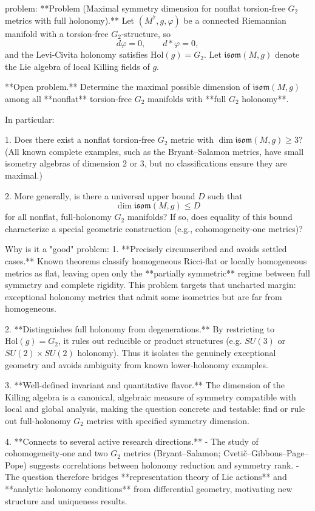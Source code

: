 problem:  
**Problem (Maximal symmetry dimension for nonflat torsion‑free \(G_2\) metrics with full holonomy).**  
Let \((M^7,g,\varphi)\) be a connected Riemannian manifold with a torsion‑free \(G_2\)-structure, so  
\[
d\varphi = 0, \qquad d{*}\varphi = 0,
\]
and the Levi‑Civita holonomy satisfies \(\mathrm{Hol}(g) = G_2\).  
Let \(\mathfrak{isom}(M,g)\) denote the Lie algebra of local Killing fields of \(g\).

**Open problem.**  
Determine the maximal possible dimension of \(\mathfrak{isom}(M,g)\) among all **nonflat** torsion‑free \(G_2\) manifolds with **full \(G_2\) holonomy**.

In particular:

1. Does there exist a nonflat torsion‑free \(G_2\) metric with \(\dim \mathfrak{isom}(M,g)\ge 3\)?  
   (All known complete examples, such as the Bryant–Salamon metrics, have small isometry algebras of dimension \(2\) or \(3\), but no classifications ensure they are maximal.)

2. More generally, is there a universal upper bound \(D\) such that  
   \[
   \dim \mathfrak{isom}(M,g) \le D
   \]
   for all nonflat, full‑holonomy \(G_2\) manifolds?  
   If so, does equality of this bound characterize a special geometric construction (e.g., cohomogeneity‑one metrics)?

Why is it a "good" problem:  
1. **Precisely circumscribed and avoids settled cases.**  
   Known theorems classify homogeneous Ricci‑flat or locally homogeneous metrics as flat, leaving open only the **partially symmetric** regime between full symmetry and complete rigidity. This problem targets that uncharted margin: exceptional holonomy metrics that admit some isometries but are far from homogeneous.

2. **Distinguishes full holonomy from degenerations.**  
   By restricting to \(\mathrm{Hol}(g)=G_2\), it rules out reducible or product structures (e.g. \(SU(3)\) or \(SU(2)\times SU(2)\) holonomy). Thus it isolates the genuinely exceptional geometry and avoids ambiguity from known lower‑holonomy examples.

3. **Well-defined invariant and quantitative flavor.**  
   The dimension of the Killing algebra is a canonical, algebraic measure of symmetry compatible with local and global analysis, making the question concrete and testable: find or rule out full‑holonomy \(G_2\) metrics with specified symmetry dimension.

4. **Connects to several active research directions.**  
   - The study of cohomogeneity‑one and two \(G_2\) metrics (Bryant–Salamon; Cvetič–Gibbons–Page–Pope) suggests correlations between holonomy reduction and symmetry rank.  
   - The question therefore bridges **representation theory of Lie actions** and **analytic holonomy conditions** from differential geometry, motivating new structure and uniqueness results.

